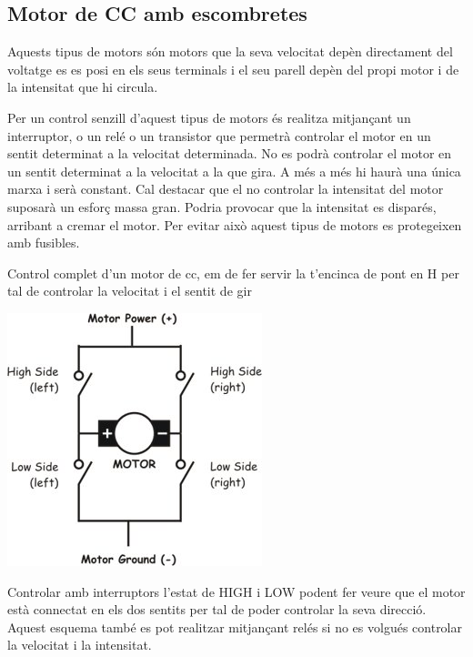 \subsection{Motor de CC amb escombretes }

Aquests tipus de motors són motors que la seva velocitat depèn directament del voltatge es es posi en els seus terminals i el seu parell depèn del propi motor i de la intensitat que hi circula.

Per un control senzill d'aquest tipus de motors és realitza mitjançant un interruptor, o un relé o un transistor que permetrà controlar el motor en un sentit determinat a la velocitat determinada. No es podrà controlar el motor en un sentit determinat a la velocitat a la que gira. A més a més hi haurà una única marxa i serà constant. Cal destacar que el no controlar la intensitat del motor suposarà un esforç massa gran. Podria provocar que la intensitat es disparés, arribant a cremar el motor. Per evitar això aquest tipus de motors es protegeixen amb fusibles.


Control complet d'un motor de cc, em de fer servir la t'encinca de pont en H per tal de controlar la velocitat i el sentit de gir\smallskip

\includegraphics[width=\textwidth]{Motors/basic-bridge}

Controlar amb interruptors l'estat de HIGH i LOW podent fer veure que el motor està connectat en els dos sentits per tal de poder controlar la seva direcció. Aquest esquema també es pot realitzar mitjançant relés si no es volgués controlar la velocitat i la intensitat.

